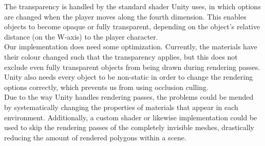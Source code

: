 The transparency is handled by the standard shader Unity uses, in which options are changed when the player moves along the fourth dimension. This enables objects to become opaque or fully transparent, depending on the object's relative distance (on the W-axis) to the player character.\\

Our implementation does need some optimization. Currently, the materials have their colour changed such that the transparency applies, but this does not exclude even fully transparent objects from being drawn during rendering passes. Unity also needs every object to be non-static in order to change the rendering options correctly, which prevents us from using occlusion culling.\\

Due to the way Unity handles rendering passes, the problems could be mended by systematically changing the properties of materials that appear in each environment. Additionally, a custom shader or likewise implementation could be used to skip the rendering passes of the completely invisible meshes, drastically reducing the amount of rendered polygons within a scene.\\